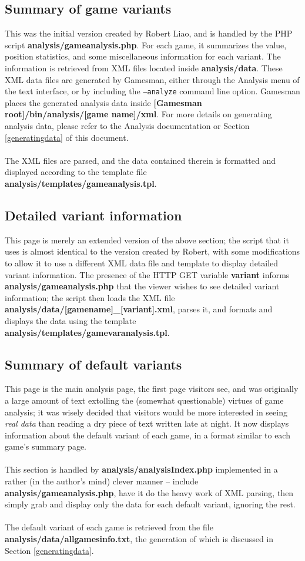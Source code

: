 \documentclass[11pt]{article}
\newcommand{\gcref}[1]{\textcolor{cyan}{\underline{\ref{#1}}}}
\begin{document}
\subsection{Summary of game variants}
This was the initial version created by Robert Liao, and is handled by the PHP script \textbf{analysis/gameanalysis.php}. For each game, it summarizes the value, position statistics, and some miscellaneous information for each variant. The information is retrieved from XML files located inside \textbf{analysis/data}. These XML data files are generated by Gamesman, either through the Analysis menu of the text interface, or by including the \texttt{--analyze} command line option. Gamesman places the generated analysis data inside \textbf{[Gamesman root]/bin/analysis/[game name]/xml}. For more details on generating analysis data, please refer to the Analysis documentation or Section \gcref{generatingdata} of this document.
\\\\The XML files are parsed, and the data contained therein is formatted and displayed according to the template file \textbf{analysis/templates/gameanalysis.tpl}.
\subsection{Detailed variant information}
This page is merely an extended version of the above section; the script that it uses is almost identical to the version created by Robert, with some modifications to allow it to use a different XML data file and template to display detailed variant information. The presence of the HTTP GET variable \textbf{variant} informs \textbf{analysis/gameanalysis.php} that the viewer wishes to see detailed variant information; the script then loads the XML file \textbf{analysis/data/[gamename]\_[variant].xml}, parses it, and formats and displays the data using the template \textbf{analysis/templates/gamevaranalysis.tpl}.
\subsection{Summary of default variants}
\label{defaultvar}
This page is the main analysis page, the first page visitors see, and was originally a large amount of text extolling the (somewhat questionable) virtues of game analysis; it was wisely decided that visitors would be more interested in seeing \textit{real data} than reading a dry piece of text written late at night. It now displays information about the default variant of each game, in a format similar to each game's summary page.
\\\\This section is handled by \textbf{analysis/analysisIndex.php} implemented in a rather (in the author's mind) clever manner -- include \textbf{analysis/gameanalysis.php}, have it do the heavy work of XML parsing, then simply grab and display only the data for each default variant, ignoring the rest. 
\\\\The default variant of each game is retrieved from the file \textbf{analysis/data/allgamesinfo.txt}, the generation of which is discussed in Section \gcref{generatingdata}.
\end{document}
